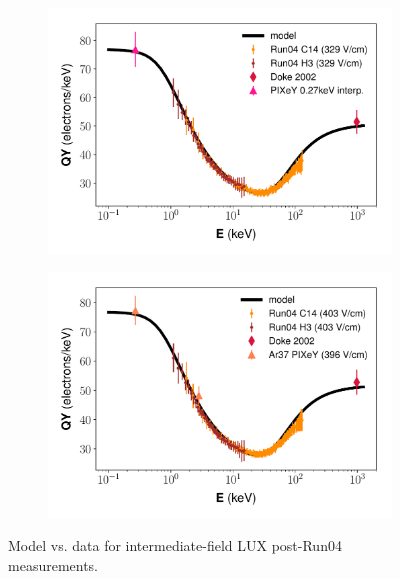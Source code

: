 \begin{figure}[!h]
\begin{subfigure}{0.5\linewidth}
\caption{}
\end{subfigure}%
\begin{subfigure}{0.5\linewidth}
\includegraphics[width=\linewidth]{Figures/Yields_fit_new/NEST_fit_329Vcm_new.pdf}
\caption{}
\end{subfigure}
\centering
\begin{subfigure}{0.5\linewidth}
\includegraphics[width=\linewidth]{Figures/Yields_fit_new/NEST_fit_403Vcm_new.pdf}
\caption{}
\end{subfigure}
\caption{Model vs. data for intermediate-field LUX post-Run04 measurements.}
\label{fig:betamod_midfield}
\end{figure}
